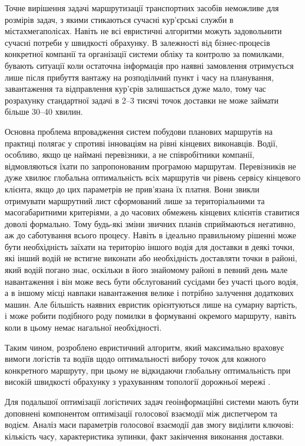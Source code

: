 Точне вирішення задачі маршрутизації транспортних засобів неможливе для розмірів задач, з якими стикаються сучасні кур’єрські служби в містахмегаполісах. Навіть не всі евристичні алгоритми можуть задовольнити сучасні потреби у швидкості обрахунку. В залежності від бізнес-процесів конкретної компанії та організації системи обліку та контролю за помилками, бувають ситуації коли остаточна інформація про наявні замовлення отримується лише після прибуття вантажу на розподільчий пункт і часу на планування, завантаження та відправлення кур’єрів залишається дуже мало, тому час розрахунку стандартної задачі в 2–3 тисячі точок доставки не може займати більше 30–40 хвилин.

Основна проблема впровадження систем побудови планових маршрутів на практиці полягає у спротиві інноваціям на рівні кінцевих виконавців. Водії, особливо, якщо це наймані перевізники, а не співробітники компанії, відмовляються їхати по запропонованим програмою маршрутам. Перевізників не дуже хвилює глобальна оптимальність всіх маршрутів чи рівень сервісу кінцевого клієнта, якщо до цих параметрів не прив’язана їх платня. Вони звикли отримувати маршрутний лист сформований лише за територіальними та масогабаритними критеріями, а до часових обмежень кінцевих клієнтів ставитися доволі формально. Тому будь-які зміни звичних планів сприймаються негативно, аж до саботування всього процесу. Навіть в ідеально правильному рішенні може бути необхідність заїхати на територію іншого водія для доставки в деякі точки, які інший водій не встигне виконати або необхідність доставляти точки в районі, який водій погано знає, оскільки в його знайомому районі в певний день мале навантаження і він може весь бути обслугований сусідами без участі цього водія, а в іншому місці навпаки навантаження велике і потрібно залучення додаткових машин. Але більшість наявних евристик орієнтуються лише на сумарну вартість, і може робити подібного роду помилки в формуванні окремого маршруту, навіть коли в цьому немає нагальної необхідності.

Таким чином, розроблено евристичний алгоритм, який максимально враховує вимоги логістів та водіїв щодо оптимальності вибору точок для кожного конкретного маршруту, при цьому не відкидаючи глобальну оптимальність при високій швидкості обрахунку з урахуванням топології дорожньої мережі \cite{eng_art1}. 

Для подальшої оптимізації логістичих задач геоінформаційні системи мають бути доповнені компонентом оптимізації голосової взаємодії між диспетчером та водієм. Аналіз маси параметрів голосової взаємодії дав змогу виділити ключові: кількість часу, характеристика зупинки, факт закінчення виконання доставки.

